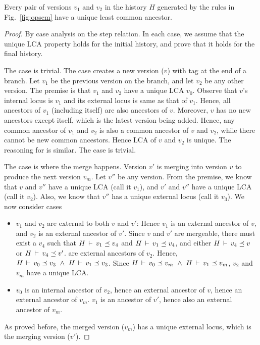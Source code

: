 \begin{theorem} 
Every pair of versions $v_1$ and $v_2$ in the history $H$ generated by
the rules in Fig.~\ref{fig:opsem} have a unique least
common ancestor. 
\end{theorem}
\begin{proof}
By case analysis on the step relation. In each case, we assume that
the unique LCA property holds for the initial history, and prove that
it holds for the final history.

The  case is trivial. The  case
creates a new version ($v$) with  tag at the end of a branch.
Let $v_1$ be the previous version on the branch, and let $v_2$ be any
other version. The premise is that $v_1$ and $v_2$ have a unique LCA
$v_0$. Observe that $v$'s internal locus is $v_1$ and its external
locus is same as that of $v_1$. Hence, all ancestors of $v_1$
(including itself) are also ancestors of $v$. Moreover, $v$ has no new
ancestors except itself, which is the latest version being added.
Hence, any common ancestor of $v_1$ and $v_2$ is also a common
ancestor of $v$ and $v_2$, while there cannot be new common ancestors.
Hence LCA of $v$ and $v_2$ is unique. The reasoning for
 is similar. The  case is trivial. 

The  case is where the merge happens. Version
$v'$ is merging into version $v$ to produce the next version $v_m$.
Let $v''$ be any version. From the premise, we know that $v$ and $v''$
have a unique LCA (call it $v_1$), and $v'$ and $v''$ have a unique
LCA (call it $v_2$). Also, we know that $v''$ has a unique external
locus (call it $v_3$). We now consider cases
\begin{itemize}
  \item $v_1$ and $v_2$ are external to both $v$ and $v'$: Hence $v_1$
  is an external ancestor of $v$, and $v_2$ is an external ancestor
  of $v'$. Since $v$ and $v'$ are mergeable, there must exist a $v_4$
  such that $H\,\vdash\,v_1 \preceq v_4$ and $H\,\vdash\,v_1 \preceq
  v_4$, and either $H\,\vdash\,v_4 \preceq v$ or $H\,\vdash\,v_4
  \preceq v'$.  are external ancestors of
  $v_2$. Hence,
  $H\,\vdash\,v_0 \preceq v_3 ~\wedge~ H\,\vdash\,v_1 \preceq v_3$.
  Since $H\,\vdash\,v_0 \preceq v_m ~\wedge~ H\,\vdash\,v_1 \preceq v_m$, 
  $v_2$ and $v_m$ have a unique LCA.

  \item $v_0$ is an internal ancestor of $v_2$, hence an external
  ancestor of $v$, hence an external ancestor of $v_m$. $v_1$ is
  an ancestor of $v'$, hence also an external ancestor of $v_m$. 
\end{itemize}


As proved
before, the merged version ($v_m$) has a unique external locus, which
is the merging version ($v'$).
\end{proof}

